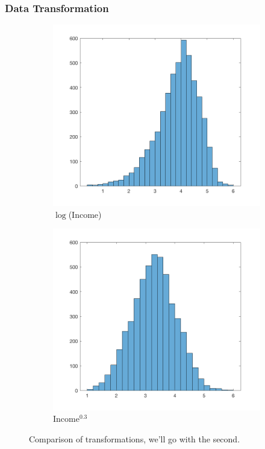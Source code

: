 \documentclass{beamer}
\begin{document}
\begin{frame}
\frametitle{Data Transformation}
    \begin{figure}	
		\centering
		\begin{subfigure}[t]{0.48\textwidth}
			\centering
			\includegraphics[width=\textwidth]{log_income}
			\caption{$\log$(Income)}
		\end{subfigure}
		\hfill
		\begin{subfigure}[t]{0.48\textwidth}
			\centering
			\includegraphics[width=\textwidth]{p03income}
			\caption{Income$^{0.3}$}
		\end{subfigure}
		\caption{Comparison of transformations, we'll go with the second.}
	\end{figure}
\end{frame}
\end{document}
